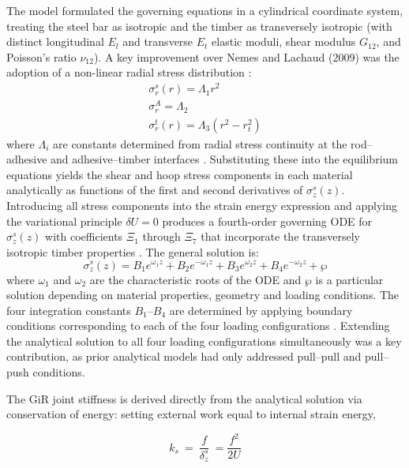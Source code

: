 The model formulated the governing equations in a cylindrical coordinate system, treating the steel bar as isotropic and the timber as transversely isotropic (with distinct longitudinal $E_{l}$ and transverse $E_{t}$ elastic moduli, shear modulus $G_{12}$, and Poisson's ratio ${\nu }_{12}$). A key improvement over Nemes and Lachaud (2009) was the adoption of a non-linear radial stress distribution \parencite{alaviAnalyticalProcedureFailure2025}:
\begin{gather}
  \sigma_r^{s}(r) = \Lambda_1 r^2 \\
  \sigma_r^{A} = \Lambda_2 \\
  \sigma_r^{t}(r) = \Lambda_3 \left( r^2 - r_t^2 \right)
\end{gather}
where $\Lambda_i$ are constants determined from radial stress continuity at the rod--adhesive and adhesive--timber interfaces \parencite{alaviAnalyticalProcedureFailure2025}. Substituting these into the equilibrium equations yields the shear and hoop stress components in each material analytically as functions of the first and second derivatives of $\sigma_z^{s}(z)$. Introducing all stress components into the strain energy expression and applying the variational principle $\delta U = 0$ produces a fourth-order governing ODE for $\sigma_z^{s}(z)$ with coefficients $\Xi_1$ through $\Xi_7$ that incorporate the transversely isotropic timber properties \parencite{alaviAnalyticalProcedureFailure2025}. The general solution is:
\begin{equation}
  \sigma_z^{s}(z) = B_1 e^{\omega_1 z} + B_2 e^{-\omega_1 z} + B_3 e^{\omega_2 z} + B_4 e^{-\omega_2 z} + \wp
\end{equation}
where $\omega_1$ and $\omega_2$ are the characteristic roots of the ODE and $\wp$ is a particular solution depending on material properties, geometry and loading conditions. The four integration constants $B_1$--$B_4$ are determined by applying boundary conditions corresponding to each of the four loading configurations \parencite{alaviAnalyticalProcedureFailure2025}. Extending the analytical solution to all four loading configurations simultaneously was a key contribution, as prior analytical models had only addressed pull--pull and pull--push conditions.

The GiR joint stiffness is derived directly from the analytical solution via conservation of energy: setting external work equal to internal strain energy, 

\begin{equation}
k_{s}\ =\ \frac{f}{{\delta }_{z}^{s}}\ =\frac{f^{2}}{2U}
\end{equation}

